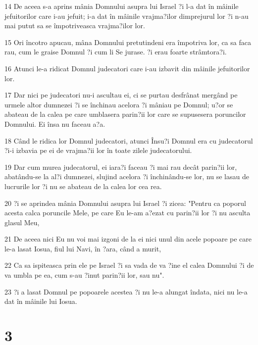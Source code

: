 \par 14 De aceea s-a aprins mânia Domnului asupra lui Israel ?i l-a dat în mâinile jefuitorilor care i-au jefuit; i-a dat în mâinile vrajma?ilor dimprejurul lor ?i n-au mai putut sa se împotriveasca vrajma?ilor lor.
\par 15 Ori încotro apucau, mâna Domnului pretutindeni era împotriva lor, ca sa faca rau, cum le graise Domnul ?i cum li Se jurase. ?i erau foarte strâmtora?i.
\par 16 Atunci le-a ridicat Domnul judecatori care i-au izbavit din mâinile jefuitorilor lor.
\par 17 Dar nici pe judecatori nu-i ascultau ei, ci se purtau desfrânat mergând pe urmele altor dumnezei ?i se închinau acelora ?i mâniau pe Domnul; u?or se abateau de la calea pe care umblasera parin?ii lor care se supusesera poruncilor Domnului. Ei însa nu faceau a?a.
\par 18 Când le ridica lor Domnul judecatori, atunci Însu?i Domnul era cu judecatorul ?i-i izbavia pe ei de vrajma?ii lor în toate zilele judecatorului.
\par 19 Dar cum murea judecatorul, ei iara?i faceau ?i mai rau decât parin?ii lor, abatându-se la al?i dumnezei, slujind acelora ?i închinându-se lor, nu se lasau de lucrurile lor ?i nu se abateau de la calea lor cea rea.
\par 20 ?i se aprindea mânia Domnului asupra lui Israel ?i zicea: "Pentru ca poporul acesta calca poruncile Mele, pe care Eu le-am a?ezat cu parin?ii lor ?i nu asculta glasul Meu,
\par 21 De aceea nici Eu nu voi mai izgoni de la ei nici unul din acele popoare pe care le-a lasat Iosua, fiul lui Navi, în ?ara, când a murit,
\par 22 Ca sa ispiteasca prin ele pe Israel ?i sa vada de va ?ine el calea Domnului ?i de va umbla pe ea, cum s-au ?inut parin?ii lor, sau nu".
\par 23 ?i a lasat Domnul pe popoarele acestea ?i nu le-a alungat îndata, nici nu le-a dat în mâinile lui Iosua.

\chapter{3}

